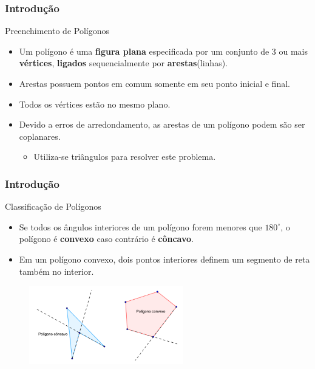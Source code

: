 \documentclass{beamer}
\begin{document}
\begin{frame}
\frametitle{Introdução}

		\begin{block}{Preenchimento de Polígonos}
		\begin{itemize}
			\item Um polígono é uma \textbf{figura plana} especificada por um conjunto de 3 ou mais \textbf{vértices}, \textbf{ligados} sequencialmente por \textbf{arestas}(linhas).
			\item Arestas possuem pontos em comum somente em seu ponto inicial e final.
			\item Todos os vértices estão no mesmo plano.
			\item Devido a erros de arredondamento, as arestas de um polígono podem são ser coplanares.
			\begin{itemize}
				\item Utiliza-se triângulos para resolver este problema.
			\end{itemize}
		\end{itemize}
		\end{block}
	
\end{frame}

\begin{frame}
\frametitle{Introdução}

		\begin{block}{Classificação de Polígonos}
		\begin{itemize}
			\item Se todos os ângulos interiores de um polígono forem menores que $180^\circ$, o polígono é \textbf{convexo} caso contrário é \textbf{côncavo}.
				\item Em um polígono convexo, dois pontos interiores definem um segmento de reta também no interior.
		\end{itemize}
		\end{block}
		
		\begin{figure}[!h]
			\begin{center}
				\includegraphics[width=0.6\textwidth]{Figures/Pol}
			\end{center}
		\end{figure}
	
\end{frame}
\end{document}
